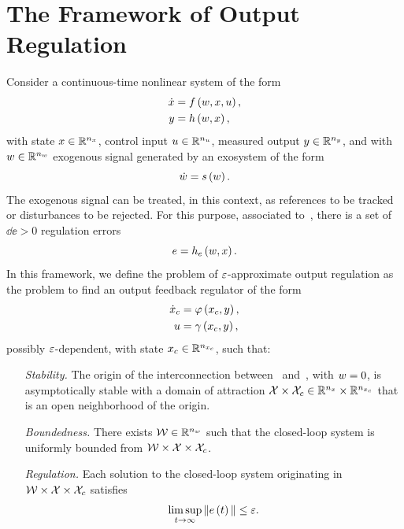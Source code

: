 \section{The Framework of Output Regulation}%
\label{SEC:FRAMEWORK-OUTPUT-REGULATION}
Consider a continuous-time nonlinear system of the form
\begin{equation}%
    \label{EQ:GENERAL-OR-SYSTEM}
    \begin{split}
        \dot{\xx} & = \xfun \lp \ww, \xx, \uu \rp, \\
        \yy & = \yfun \lp \ww, \xx \rp,
    \end{split}
\end{equation}
with state $x \in \mathbb{R}^{n_{x}}$, control input $u \in \mathbb{R}^{n_{u}}$, measured output $y \in \mathbb{R}^{n_{y}}$, and
with $w \in \mathbb{R}^{n_{w}}$ exogenous signal generated by an exosystem of the form
\begin{equation}%
    \label{EQ:GENERAL-EXOSYSTEM}
    \dot{\ww} = \wfun \lp \ww \rp.
\end{equation}
The exogenous signal can be treated, in this context, as references to be tracked or disturbances to be rejected.
For this purpose, associated to~, there is a set of $\dd{\ee} > 0$ regulation errors
\begin{equation*}
    e = h_{e} \left( w, x \right).
\end{equation*}
In this framework, we define the problem of $\varepsilon$-approximate output regulation as the problem to find
an output feedback regulator of the form
\begin{equation}%
    \label{EQ:GENERAL-OR-REGULATOR}
    \begin{split}
        \dot{\xx}_c & = \rfun \lp \xx_c, \yy \rp, \\
        \uu & = \actfun \lp \xx_c, \yy \rp,
    \end{split}
\end{equation}
possibly $\varepsilon$-dependent, with state $x_c \in \mathbb{R}^{n_{x_c}}$, such that:
\begin{itemize}
    \item[\emph{Stability.}] The origin of the interconnection between~ and~,
    with $w = 0$, is asymptotically stable with a domain of attraction $\mathcal{X} \times \mathcal{X}_c \in \mathbb{R}^{n_{x}} \times \mathbb{R}^{n_{x_c}}$
    that is an open neighborhood of the origin.
    \item[\emph{Boundedness.}] There exists $\mathcal{W} \in \mathbb{R}^{n_{w}}$ such that the closed-loop system is uniformly bounded from
    $\mathcal{W} \times \mathcal{X} \times \mathcal{X}_c$.
    \item[\emph{Regulation.}] Each solution to the closed-loop system originating in $\mathcal{W} \times \mathcal{X} \times \mathcal{X}_c$ satisfies
    \begin{equation*}
        \limsup_{t \rightarrow \infty} \| e \left( t \right) \| \le \varepsilon.
    \end{equation*}
\end{itemize}

